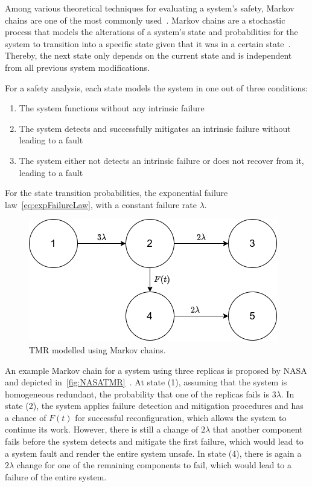 Among various theoretical techniques for evaluating a system's safety, Markov chains are one of the most commonly used~\cite{BarryFaultToleranceAnalysis}.
Markov chains are a stochastic process that models the alterations of a system's state and probabilities for the system to transition into a specific state given that it was in a certain state~\cite{KemenyMarkovChains}.
Thereby, the next state only depends on the current state and is independent from all previous system modifications.

For a safety analysis, each state models the system in one out of three conditions:
\begin{enumerate}
\item The system functions without any intrinsic failure
\item The system detects and successfully mitigates an intrinsic failure without leading to a fault
\item The system either not detects an intrinsic failure or does not recover from it, leading to a fault
\end{enumerate}

For the state transition probabilities, the exponential failure law~\autoref{eq:expFailureLaw}, with a constant failure rate $\lambda$.

\begin{figure}[!hb]
	\centering
	\includegraphics[width=0.75\linewidth]{images/TriplexSystemNASA}
	\caption{\Gls*{TMR} modelled using Markov chains.}
	\label{fig:NASATMR}
\end{figure}

An example Markov chain for a system using three replicas is proposed by NASA and depicted in~\autoref{fig:NASATMR}~\cite{NASAMarkovChains}.
At state (1), assuming that the system is homogeneous redundant, the probability that one of the replicas fails is $3\lambda$.
In state (2), the system applies failure detection and mitigation procedures and has a chance of $F(t)$ for successful reconfiguration, which allows the system to continue its work.
However, there is still a change of $2\lambda$ that another component fails before the system detects and mitigate the first failure, which would lead to a system fault and render the entire system unsafe.
In state (4), there is again a $2\lambda$ change for one of the remaining components to fail, which would lead to a failure of the entire system.

